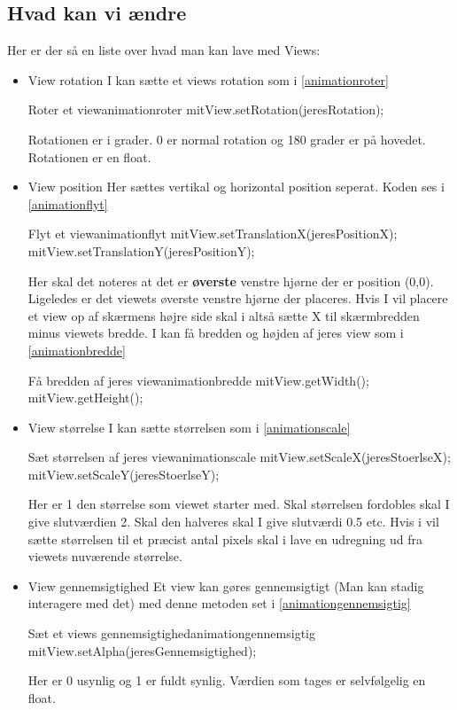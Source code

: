 \subsection{Hvad kan vi ændre}
Her er der så en liste over hvad man kan lave med Views:\\
\begin{itemize}
	\item View rotation
	I kan sætte et views rotation som i \autoref{animationroter}
	\begin{JavaCode}{Roter et view}{animationroter}
		mitView.setRotation(jeresRotation);
	\end{JavaCode}
	Rotationen er i grader. 0 er normal rotation og 180 grader er på hovedet. Rotationen er en float. 
	\\
	\item View position
	Her sættes vertikal og horizontal position seperat. Koden ses i \autoref{animationflyt}
	\begin{JavaCode}{Flyt et view}{animationflyt}
		mitView.setTranslationX(jeresPositionX);
		mitView.setTranslationY(jeresPositionY);
	\end{JavaCode}
	Her skal det noteres at det er \textbf{øverste} venstre hjørne der er position (0,0). Ligeledes er det viewets øverste venstre hjørne der placeres. Hvis I vil placere et view op af skærmens højre side skal i altså sætte X til skærmbredden minus viewets bredde. I kan få bredden og højden af jeres view som i \autoref{animationbredde}
	\begin{JavaCode}{Få bredden af jeres view}{animationbredde}
		mitView.getWidth();
		mitView.getHeight();
	\end{JavaCode}
	\item View størrelse
	I kan sætte størrelsen som i \autoref{animationscale} 
	\begin{JavaCode}{Sæt størrelsen af jeres view}{animationscale}
		mitView.setScaleX(jeresStoerlseX);
		mitView.setScaleY(jeresStoerlseY);
	\end{JavaCode}
	Her er 1 den størrelse som viewet starter med. Skal størrelsen fordobles skal I give slutværdien 2. Skal den halveres skal I give slutværdi 0.5 etc. Hvis i vil sætte størrelsen til et præcist antal pixels skal i lave en udregning ud fra viewets nuværende størrelse. \\
	\item View gennemsigtighed
	Et view kan gøres gennemsigtigt (Man kan stadig interagere med det) med denne metoden set i \autoref{animationgennemsigtig}
	\begin{JavaCode}{Sæt et views gennemsigtighed}{animationgennemsigtig}
		mitView.setAlpha(jeresGennemsigtighed);
	\end{JavaCode}
	Her er 0 usynlig og 1 er fuldt synlig. Værdien som tages er selvfølgelig en float.
\end{itemize}

